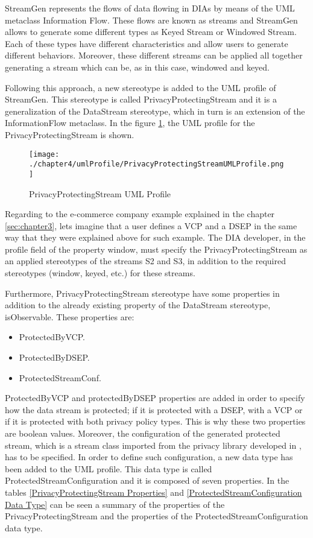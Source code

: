 StreamGen represents the flows of data flowing in DIAs by means of the UML metaclass Information Flow. These flows are known as streams and StreamGen allows to generate some different types as Keyed Stream or Windowed Stream. Each of these types have different characteristics and allow users to generate different behaviors. Moreover, these different streams can be applied all together generating a stream which can be, as in this case, windowed and keyed.

Following this approach, a new stereotype is added to the UML profile of StreamGen. This stereotype is called PrivacyProtectingStream and it is a generalization of the DataStream stereotype, which in turn is an extension of the InformationFlow metaclass. In the figure \ref{fig:PrivacyProtectingStream UML Profile}, the UML profile for the PrivacyProtectingStream is shown.

\begin{figure}
\centering
{\texttt{[image: ./chapter4/umlProfile/PrivacyProtectingStreamUMLProfile.png]}}
\caption{PrivacyProtectingStream UML Profile}
\label{fig:PrivacyProtectingStream UML Profile}
\end{figure}

Regarding to the e-commerce company example explained in the chapter \ref{sec:chapter3}, lets imagine that a user defines a VCP and a DSEP in the same way that they were explained above for such example. The DIA developer, in the profile field of the property window, must specify the PrivacyProtectingStream as an applied stereotypes of the streams S2 and S3, in addition to the required stereotypes (window, keyed, etc.) for these streams. 

Furthermore, PrivacyProtectingStream stereotype have some properties in addition to the already existing property of the DataStream stereotype, isObservable. These properties are:

\begin{itemize}
\item ProtectedByVCP.
\item ProtectedByDSEP.
\item ProtectedStreamConf.
\end{itemize}

ProtectedByVCP and protectedByDSEP properties are added in order to specify how the data stream is protected; if it is protected with a DSEP, with a VCP or if it is protected with both privacy policy types. This is why these two properties are boolean values. Moreover, the configuration of the generated protected stream, which is a stream class imported from the privacy library developed in \cite{privacypoliciesarticle}, has to be specified. In order to define such configuration, a new data type has been added to the UML profile. This data type is called ProtectedStreamConfiguration and it is composed of seven properties. In the tables \ref{PrivacyProtectingStream Properties} and \ref{ProtectedStreamConfiguration Data Type} can be seen a summary of the properties of the PrivacyProtectingStream and the properties of the ProtectedStreamConfiguration data type.

